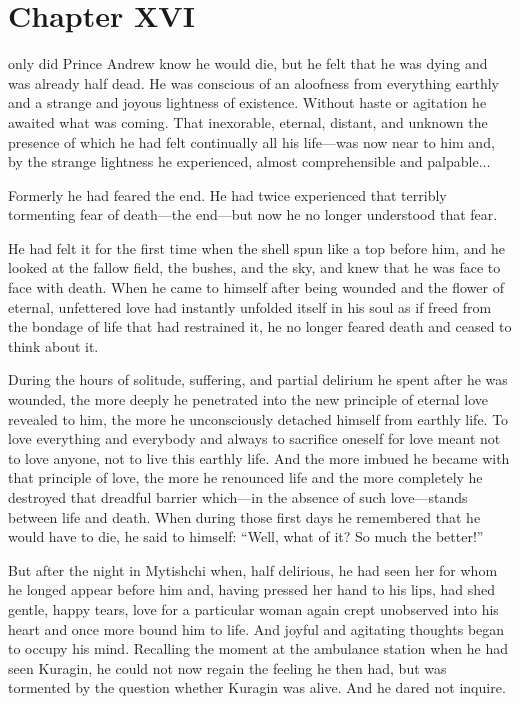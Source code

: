  
\chapter*{Chapter XVI} \ifaudio {}
\fi

 only did Prince Andrew know he would die, but he felt that he
was dying and was already half dead. He was conscious of an
aloofness from everything earthly and a strange and joyous
lightness of existence.  Without haste or agitation he awaited
what was coming. That inexorable, eternal, distant, and unknown
the presence of which he had felt continually all his life---was
now near to him and, by the strange lightness he experienced,
almost comprehensible and palpable...

Formerly he had feared the end. He had twice experienced that
terribly tormenting fear of death---the end---but now he no
longer understood that fear.

He had felt it for the first time when the shell spun like a top
before him, and he looked at the fallow field, the bushes, and
the sky, and knew that he was face to face with death. When he
came to himself after being wounded and the flower of eternal,
unfettered love had instantly unfolded itself in his soul as if
freed from the bondage of life that had restrained it, he no
longer feared death and ceased to think about it.

During the hours of solitude, suffering, and partial delirium he
spent after he was wounded, the more deeply he penetrated into
the new principle of eternal love revealed to him, the more he
unconsciously detached himself from earthly life. To love
everything and everybody and always to sacrifice oneself for love
meant not to love anyone, not to live this earthly life. And the
more imbued he became with that principle of love, the more he
renounced life and the more completely he destroyed that dreadful
barrier which---in the absence of such love---stands between life
and death. When during those first days he remembered that he
would have to die, he said to himself: ``Well, what of it? So
much the better!''

But after the night in Mytishchi when, half delirious, he had
seen her for whom he longed appear before him and, having pressed
her hand to his lips, had shed gentle, happy tears, love for a
particular woman again crept unobserved into his heart and once
more bound him to life. And joyful and agitating thoughts began
to occupy his mind. Recalling the moment at the ambulance station
when he had seen Kuragin, he could not now regain the feeling he
then had, but was tormented by the question whether Kuragin was
alive. And he dared not inquire.

